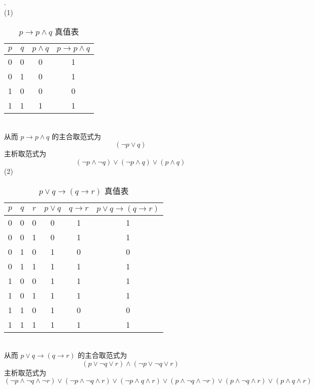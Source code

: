 \documentclass{article}
\begin{document}
.\\
(1) 
\begin{table}[h!]
    \begin{center}
      \caption{$p \to p \wedge q$ 真值表}
      \setlength{\tabcolsep}{8mm} {
      \begin{tabular}{|c|c|c|c|} 
        \textbf{$p$} & \textbf{$q$} & \textbf{$p \wedge q$} & \textbf{$p \to p \wedge q$}\\
        \hline
        0 & 0 & 0 & 1\\
        0 & 1 & 0 & 1\\
        1 & 0 & 0 & 0\\
        1 & 1 & 1 & 1\\
      \end{tabular} }
    \end{center}
  \end{table}
\\
从而 $p \to p \wedge q$ 的主合取范式为 
\[  
(\neg p \vee q)
\]
主析取范式为
\[
(\neg p \wedge \neg q) \vee (\neg p \wedge q) \vee (p \wedge q)  
\]
(2)
\begin{table}[h!]
  \begin{center}
    \caption{$p \vee q \to (q \to r)$ 真值表}
    \setlength{\tabcolsep}{8mm} {
    \begin{tabular}{|c|c|c|c|c|c|} 
      \textbf{$p$} & \textbf{$q$} & \textbf{$r$} & \textbf{$p \vee q$} & \textbf{$q \to r$} & \textbf{$p \vee q \to (q \to r)$}\\
      \hline
      0 & 0 & 0 & 0 & 1 & 1\\
      0 & 0 & 1 & 0 & 1 & 1\\
      0 & 1 & 0 & 1 & 0 & 0\\
      0 & 1 & 1 & 1 & 1 & 1\\
      1 & 0 & 0 & 1 & 1 & 1\\
      1 & 0 & 1 & 1 & 1 & 1\\
      1 & 1 & 0 & 1 & 0 & 0\\
      1 & 1 & 1 & 1 & 1 & 1\\
    \end{tabular} }
  \end{center}
\end{table}
\\
从而 $p \vee q \to (q \to r)$ 的主合取范式为
\[
(p \vee \neg q \vee r) \wedge (\neg p \vee \neg q \vee r)  
\]
主析取范式为
\[
(\neg p \wedge \neg q \wedge \neg r) \vee (\neg p \wedge \neg q \wedge r) \vee 
(\neg p \wedge q \wedge r) \vee (p \wedge \neg q \wedge \neg r) \vee (p \wedge \neg q \wedge r)
\vee (p \wedge q \wedge r)  
\]
\end{document}
